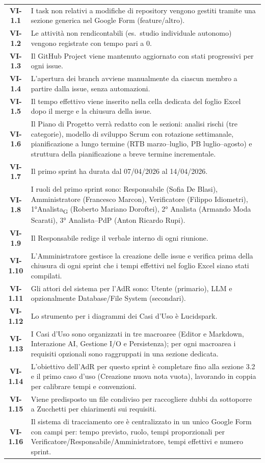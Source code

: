 \begin{longtable}{c p{12cm}}
	\textbf{VI-1.1} & I task non relativi a modifiche di repository vengono gestiti tramite una sezione generica nel Google Form (feature/altro). \\[4pt]
	\textbf{VI-1.2} & Le attività non rendicontabili (es.\ studio individuale autonomo) vengono registrate con tempo pari a 0. \\[4pt]
	\textbf{VI-1.3} & Il GitHub Project viene mantenuto aggiornato con stati progressivi per ogni issue. \\[4pt]
	\textbf{VI-1.4} & L'apertura dei branch avviene manualmente da ciascun membro a partire dalla issue, senza automazioni. \\[4pt]
	\textbf{VI-1.5} & Il tempo effettivo viene inserito nella cella dedicata del foglio Excel dopo il merge e la chiusura della issue. \\[4pt]
	\textbf{VI-1.6} & Il Piano di Progetto verrà redatto con le sezioni: analisi rischi (tre categorie), modello di sviluppo Scrum con rotazione settimanale, pianificazione a lungo termine (RTB marzo–luglio, PB luglio–agosto) e struttura della pianificazione a breve termine incrementale. \\[4pt]
	\textbf{VI-1.7} & Il primo sprint ha durata dal 07/04/2026 al 14/04/2026. \\[4pt]
	\textbf{VI-1.8} & I ruoli del primo sprint sono: Responsabile (Sofia De Blasi), Amministratore (Francesco Marcon), Verificatore (Filippo Idiometri), 1°Analista\textsubscript{G} (Roberto Mariano Doroftei), 2° Analista (Armando Moda Scarati), 3° Analista--PdP (Anton Ricardo Rupi). \\[4pt]
	\textbf{VI-1.9} & Il Responsabile redige il verbale interno di ogni riunione. \\[4pt]
	\textbf{VI-1.10} & L'Amministratore gestisce la creazione delle issue e verifica prima della chiusura di ogni sprint che i tempi effettivi nel foglio Excel siano stati compilati. \\[4pt]
	\textbf{VI-1.11} & Gli attori del sistema per l'AdR sono: Utente (primario), LLM e opzionalmente Database/File System (secondari). \\[4pt]
	\textbf{VI-1.12} & Lo strumento per i diagrammi dei Casi d'Uso è Lucidspark. \\[4pt]
	\textbf{VI-1.13} & I Casi d'Uso sono organizzati in tre macroaree (Editor e Markdown, Interazione AI, Gestione I/O e Persistenza); per ogni macroarea i requisiti opzionali sono raggruppati in una sezione dedicata. \\[4pt]
	\textbf{VI-1.14} & L'obiettivo dell'AdR per questo sprint è completare fino alla sezione 3.2 e il primo caso d'uso (Creazione nuova nota vuota), lavorando in coppia per calibrare tempi e convenzioni. \\[4pt]
	\textbf{VI-1.15} & Viene predisposto un file condiviso per raccogliere dubbi da sottoporre a Zucchetti per chiarimenti sui requisiti. \\[4pt]
	\textbf{VI-1.16} & Il sistema di tracciamento ore è centralizzato in un unico Google Form con campi per: tempo previsto, ruolo, tempi proporzionali per Verificatore/Responsabile/Amministratore, tempi effettivi e numero sprint. \\
\end{longtable}

